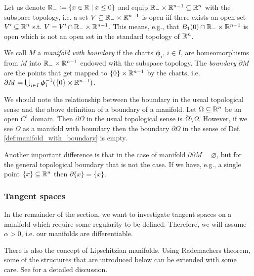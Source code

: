 \documentclass[../master_thesis.tex]{subfiles}
\begin{document}
Let us denote $\mathbb{R}_- \vcentcolon= \{ x \in \mathbb{R} \mid x \leq 0 \}$ 
and equip $\mathbb{R}_- \times \mathbb{R}^{n-1} \subseteq \mathbb{R}^n$ with the 
subspace topology, i.e. a set $V \subseteq \mathbb{R}_- \times \mathbb{R}^{n-1}$ is
open iif there exists an open set $V' \subseteq \mathbb{R}^n$ s.t. 
$V = V' \cap \mathbb{R}_- \times \mathbb{R}^{n-1}$. This means, e.g., that 
$B_1(0) \cap \mathbb{R}_- \times \mathbb{R}^{n-1}$ is open which is not an open set 
in the standard topology of $\mathbb{R}^n$.
\begin{definition}\label{def:manifold_with_boundary}
    We call $M$ a \textit{manifold with boundary} if the charts $\boldsymbol{\phi}_i$, 
    $i\in I$, are homeomorphisms from $M$ into $\mathbb{R}_- \times \mathbb{R}^{n-1}$ 
    endowed with the subspace topology. The \textit{boundary} 
    $\partial M$ are the points that get mapped to $\{0\} \times \mathbb{R}^{n-1}$ 
    by the charts, i.e. $\partial M = \bigcup_{i\in I} \boldsymbol{\phi}_i^{-1}(\{0\} \times \mathbb{R}^{n-1})$.
\end{definition}

\begin{remark}
    We should note the relationship between the boundary in the usual topological sense 
    and the above definition of a boundary of a manifold. Let $\Omega \subseteq \mathbb{R}^n$ be 
    an open $C^1$ domain. Then $\partial \Omega$ in the usual topological sense 
    is $\overline{\Omega} \setminus \Omega$. However, if we see $\Omega$ 
    as a manifold with boundary then the boundary $\partial \Omega$ in the sense of 
    Def. \ref{def:manifold_with_boundary} is empty. 

    Another important difference is that in the case of manifold $\partial \partial M = \varnothing$,
    but for the general topological boundary that is not the case. If we have, e.g., a single 
    point $\{ x \} \subseteq \mathbb{R}^n$ then $\partial \{x \} = \{ x \}$.   
\end{remark}

\subsubsection{Tangent spaces}\label{sec:tangent_spaces}

In the remainder of the section, we want to investigate tangent spaces on a manifold 
which require some regularity to be defined. Therefore, 
we will assume $\alpha > 0$, i.e. our manifolds are 
differentiable.

\begin{remark}
    There is also the concept of Lipschitzian manifolds. Using Rademachers 
    theorem, some of the structures that are introduced below can be extended 
    with some care. See \cite{lipschitz_manifolds} for a detailed discussion.
\end{remark}
\end{document}
